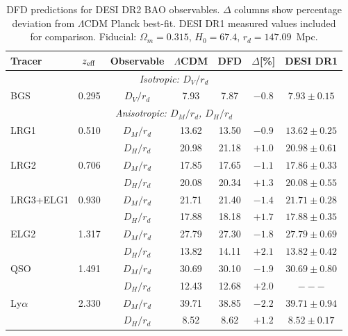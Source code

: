 \documentclass[11pt,a4paper]{article}
\newcommand{\LCDM}{$\Lambda$CDM}
\begin{document}
\begin{table}[H]
\centering
\caption{DFD predictions for DESI DR2 BAO observables. $\Delta$ columns
show percentage deviation from \LCDM{} Planck best-fit. DESI DR1
measured values included for comparison. Fiducial: $\Omega_m = 0.315$,
$H_0 = 67.4$, $r_d = 147.09$~Mpc.}
\label{tab:desi_predictions}
\small
\begin{tabular}{lcccccc}
\toprule
\textbf{Tracer} & $z_{\rm eff}$ &
\textbf{Observable} & \textbf{\LCDM} & \textbf{DFD} &
$\Delta$[\%] & \textbf{DESI DR1} \\
\midrule
\multicolumn{7}{c}{\textit{Isotropic: $D_V/r_d$}} \\
\midrule
BGS & 0.295 & $D_V/r_d$ & 7.93 & 7.87 & $-0.8$ &
$7.93 \pm 0.15$ \\
\midrule
\multicolumn{7}{c}{\textit{Anisotropic: $D_M/r_d$, $D_H/r_d$}} \\
\midrule
LRG1 & 0.510 & $D_M/r_d$ & 13.62 & 13.50 & $-0.9$ &
$13.62 \pm 0.25$ \\
     &       & $D_H/r_d$ & 20.98 & 21.18 & $+1.0$ &
$20.98 \pm 0.61$ \\[4pt]
LRG2 & 0.706 & $D_M/r_d$ & 17.85 & 17.65 & $-1.1$ &
$17.86 \pm 0.33$ \\
     &       & $D_H/r_d$ & 20.08 & 20.34 & $+1.3$ &
$20.08 \pm 0.55$ \\[4pt]
LRG3+ELG1 & 0.930 & $D_M/r_d$ & 21.71 & 21.40 & $-1.4$ &
$21.71 \pm 0.28$ \\
     &       & $D_H/r_d$ & 17.88 & 18.18 & $+1.7$ &
$17.88 \pm 0.35$ \\[4pt]
ELG2 & 1.317 & $D_M/r_d$ & 27.79 & 27.30 & $-1.8$ &
$27.79 \pm 0.69$ \\
     &       & $D_H/r_d$ & 13.82 & 14.11 & $+2.1$ &
$13.82 \pm 0.42$ \\[4pt]
QSO & 1.491 & $D_M/r_d$ & 30.69 & 30.10 & $-1.9$ &
$30.69 \pm 0.80$ \\
     &       & $D_H/r_d$ & 12.43 & 12.68 & $+2.0$ &
$--- $ \\[4pt]
Ly$\alpha$ & 2.330 & $D_M/r_d$ & 39.71 & 38.85 & $-2.2$ &
$39.71 \pm 0.94$ \\
     &       & $D_H/r_d$ & 8.52 & 8.62 & $+1.2$ &
$8.52 \pm 0.17$ \\
\bottomrule
\end{tabular}
\end{table}
\end{document}
